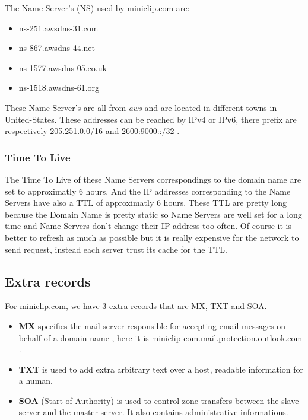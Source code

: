 \documentclass{article}
\begin{document}
The Name Server's (NS) used by \url{miniclip.com} are:
\begin{itemize}
    \itemsep-0.1em 
    \item ns-251.awsdns-31.com
    \item ns-867.awsdns-44.net
    \item ns-1577.awsdns-05.co.uk
    \item ns-1518.awsdns-61.org
\end{itemize}

These Name Server's are all from \textit{aws} and are located in different towns in United-States. These addresses can be reached by IPv4 or IPv6, there prefix are respectively 205.251.0.0/16 and 2600:9000::/32 .

\subsubsection{Time To Live}
\label{subsub:nsttl}

The Time To Live of these Name Servers correspondings to the domain name are set to approximatly 6 hours. And the IP addresses corresponding to the Name Servers have also a TTL of approximatly 6 hours. These TTL are pretty long because the Domain Name is pretty static so Name Servers are well set for a long time and Name Servers don't change their IP address too often. Of course it is better to refresh as much as possible but it is really expensive for the network to send request, instead each server trust its cache for the TTL.

\subsection{Extra records}
\label{subsub:extra}

For \url{miniclip.com}, we have 3 extra records that are MX, TXT and SOA.
\begin{itemize}
    \itemsep-0.1em
    \item \textbf{MX} specifies the mail server responsible for accepting email messages on behalf of a domain name \cite{mx}, here it is \url{miniclip-com.mail.protection.outlook.com} . 
    \item \textbf{TXT} is used to add extra arbitrary text over a host, readable information for a human.
    \item \textbf{SOA} (Start of Authority) is used to control zone transfers between the slave server and the master server. It also contains administrative informations.
\end{itemize}
\end{document}
